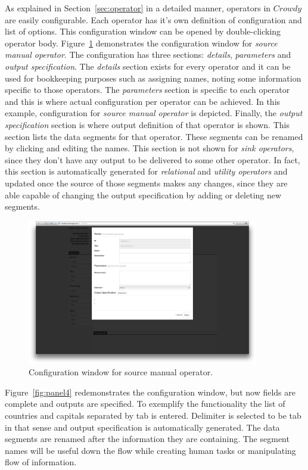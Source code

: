 As explained in Section~\ref{sec:operator} in a detailed manner, operators in $Crowdy$ 
are easily configurable. Each operator has it's own definition of configuration and list 
of options. This configuration window can be opened by double-clicking operator body. 
Figure~\ref{fig:panel3} demonstrates the configuration window for
\textit{source manual operator}. The configuration has three sections: \textit{details}, 
\textit{parameters} and \textit{output specification}. The \textit{details} section exists for 
every operator and it can be used for bookkeeping purposes such as assigning 
names, noting some information specific to those operators. The \textit{parameters} 
section is specific to each operator and this is where actual configuration per operator 
can be achieved. In this example, configuration for \textit{source manual operator} 
is depicted. Finally, the \textit{output specification} section is where output definition 
of that operator is shown. This section lists the data segments for that operator. These 
segments can be renamed by clicking and editing the names. This section is 
not shown for \textit{sink operators}, since they don't have any output to be delivered 
to some other operator. In fact, this section is automatically generated for 
\textit{relational} and \textit{utility operators} and updated once the source of those 
segments makes any changes, since they are able capable of changing the 
output specification by adding or deleting new segments.

\begin{figure}[ht]
	\centering
	\includegraphics[width=0.9\textwidth]{figures/tool/panel3.png}
	\caption{Configuration window for source manual operator.}
	\label{fig:panel3}
\end{figure}

Figure~\ref{fig:panel4} redemonstrates the configuration window, but 
now fields are complete and outputs are specified. To exemplify the functionality 
the list of countries and capitals separated by tab is entered. Delimiter is selected 
to be tab in that sense and output specification is automatically generated. The 
data segments are renamed after the information they are containing. The 
segment names will be useful down the flow while creating human tasks or 
manipulating flow of information.

